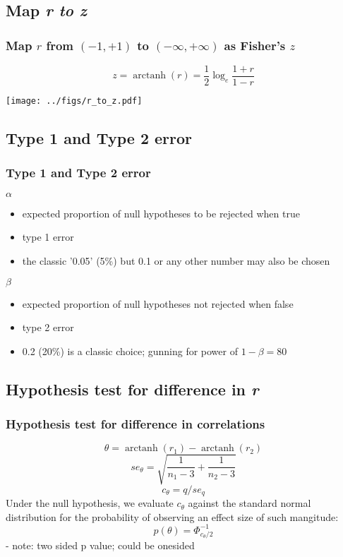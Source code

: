 \documentclass{beamer}
\DeclareMathOperator\arctanh{arctanh}
\begin{document}
  \subsection{Map \it{r} to \it{z}} 
  \begin{frame}
    \frametitle{Map \(r\) from \((-1,+1)\) to \((-\infty,+\infty)\) as Fisher's \(z\) }
    \[z     = \arctanh(r) = \frac{1}{2} \log_e \frac{1+r}{1-r} \]
    \begin{center}
      \texttt{[image: ../figs/r\_to\_z.pdf]}
    \end{center}
  \end{frame}

  \subsection{Type 1 and Type 2 error}
  \begin{frame}
    \frametitle{Type 1 and Type 2 error }  
    \(\alpha\)
    \begin{itemize}
      \item expected proportion of null hypotheses to be rejected when true 
      \item type 1 error
      \item the classic '0.05' (5\%)\; but 0.1 or any other number may also be chosen 
    \end{itemize}
    
    \(\beta\)
    \begin{itemize}
      \item expected proportion of null hypotheses not rejected when false 
      \item type 2 error
      \item 0.2 (20\%) is a classic choice; gunning for power of \(1 - \beta = 80\)
    \end{itemize}
  \end{frame} 

  \subsection{Hypothesis test for difference in \it{r}}  
  \begin{frame}
    \frametitle{Hypothesis test for difference in correlations  }
    \[\theta     = \arctanh(r_1) - \arctanh(r_2)          \]
    \[se_\theta  = \sqrt{\frac{1}{n_1-3}+\frac{1}{n_2-3}} \]
    \[c_\theta   = q / se_q                               \] 
    Under the null hypothesis, we evaluate \(c_\theta\) against the standard normal distribution for the probability of observing an effect size of such mangitude:
    \[p(\theta)  =  \Phi_{c_\theta/2}^{-1}                \]
      - note: two sided p value; could be onesided
  \end{frame}   
\end{document}
